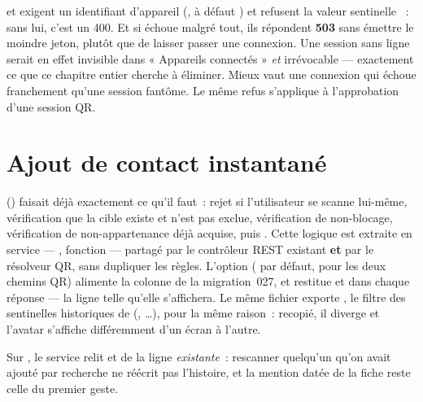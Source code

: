 \begin{alerte}
 et  exigent un identifiant d'appareil
(, à défaut ) et refusent la valeur sentinelle
~: sans lui, c'est un 400. Et si  échoue malgré tout,
ils répondent \textbf{503} sans émettre le moindre jeton, plutôt que de laisser passer une
connexion. Une session sans ligne  serait en effet invisible dans
« Appareils connectés » \emph{et} irrévocable --- exactement ce que ce chapitre entier
cherche à éliminer. Mieux vaut une connexion qui échoue franchement qu'une session
fantôme. Le même refus s'applique à l'approbation d'une session QR.
\end{alerte}

\chapter{Ajout de contact instantané}
\label{ch:qr-contact}

 () faisait
déjà exactement ce qu'il faut~: rejet si l'utilisateur se scanne lui-même, vérification que
la cible existe et n'est pas exclue, vérification de non-blocage, vérification de
non-appartenance déjà acquise, puis . Cette logique est extraite en service
--- , fonction
 --- partagé par le
contrôleur REST existant \textbf{et} par le résolveur QR, sans dupliquer les règles.
L'option  ( par défaut,  pour les deux chemins
QR) alimente la colonne de la migration~027, et  restitue
 et  dans chaque réponse --- la ligne telle qu'elle
s'affichera. Le même fichier exporte , le filtre des sentinelles
historiques de  (, \ldots{}),
pour la même raison~: recopié, il diverge et l'avatar s'affiche différemment d'un écran à
l'autre.

\begin{note}
Sur , le service relit  et  de la ligne
\emph{existante}~: rescanner quelqu'un qu'on avait ajouté par recherche ne réécrit pas
l'histoire, et la mention datée de la fiche reste celle du premier geste.
\end{note}

